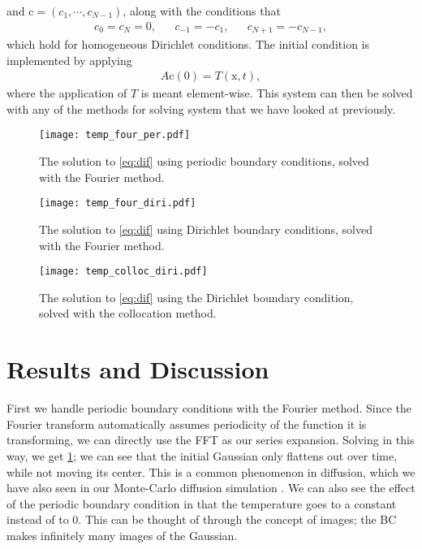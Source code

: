 \documentclass[10pt,a4paper,twocolumn]{article}
\renewcommand{\vec}[1]{\bm{\mathrm{#1}}}
\begin{document}
%
and $\vec{c} = (c_1, \cdots, c_{N-1})$, along with the conditions that
%
\begin{align}
    &c_0 = c_N = 0,& &c_{-1} = - c_1,& &c_{N+1} = -c_{N-1},&
\end{align}
which hold for homogeneous Dirichlet conditions. The initial condition is implemented by applying
%
\begin{align}
    A \vec{c}(0) = T(\vec{x}, t),
\end{align}
%
where the application of $T$ is meant element-wise. This system can then be solved with any of the methods for solving system that we have looked at previously.


\begin{figure}
    \centering
    \captionsetup{justification=centering}
    \texttt{[image: temp\_four\_per.pdf]}
    \caption{The solution to \cref{eq:dif} using periodic boundary conditions, solved with the Fourier method.}
    \label{fig:four_per}
\end{figure}

\begin{figure}
    \centering
    \captionsetup{justification=centering}
    \texttt{[image: temp\_four\_diri.pdf]}
    \caption{The solution to \cref{eq:dif} using Dirichlet boundary conditions, solved with the Fourier method.}
    \label{fig:four_diri}
\end{figure}

\begin{figure}
    \centering
    \captionsetup{justification=centering}
    \texttt{[image: temp\_colloc\_diri.pdf]}
    \caption{The solution to \cref{eq:dif} using the Dirichlet boundary condition, solved with the collocation method.}
    \label{fig:colloc_diri}
\end{figure}

\section{Results and Discussion}

First we handle periodic boundary conditions with the Fourier method. Since the Fourier transform automatically assumes periodicity of the function it is transforming, we can directly use the FFT as our series expansion. Solving in this way, we get \cref{fig:four_per}; we can see that the initial Gaussian only flattens out over time, while not moving its center. This is a common phenomenon in diffusion, which we have also seen in our Monte-Carlo diffusion simulation \cite{me_walks}. We can also see the effect of the periodic boundary condition in that the temperature goes to a constant instead of to $0$. This can be thought of through the concept of images; the BC makes infinitely many images of the Gaussian.
\end{document}
